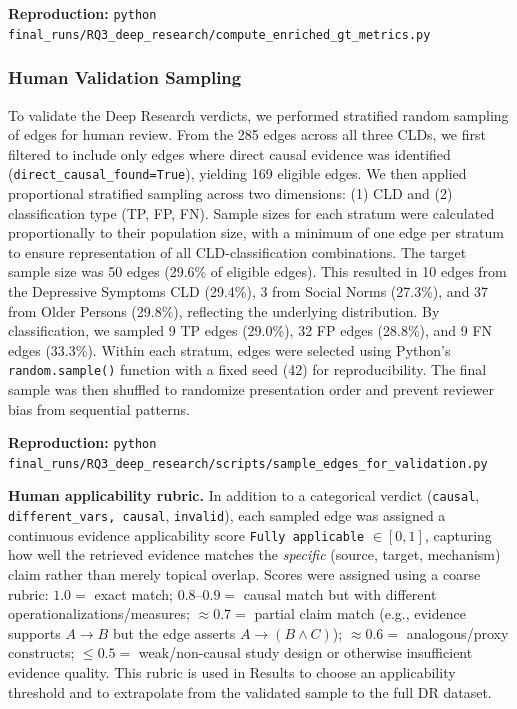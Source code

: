 \textbf{Reproduction:} \texttt{python final\_runs/RQ3\_deep\_research/compute\_enriched\_gt\_metrics.py}

\subsubsection{Human Validation Sampling}
\label{sec:rq3_human_validation}

To validate the Deep Research verdicts, we performed stratified random sampling of edges for human review. From the 285 edges across all three CLDs, we first filtered to include only edges where direct causal evidence was identified (\texttt{direct\_causal\_found=True}), yielding 169 eligible edges. We then applied proportional stratified sampling across two dimensions: (1) CLD and (2) classification type (TP, FP, FN). Sample sizes for each stratum were calculated proportionally to their population size, with a minimum of one edge per stratum to ensure representation of all CLD-classification combinations. The target sample size was 50 edges (29.6\% of eligible edges). This resulted in 10 edges from the Depressive Symptoms CLD (29.4\%), 3 from Social Norms (27.3\%), and 37 from Older Persons (29.8\%), reflecting the underlying distribution. By classification, we sampled 9 TP edges (29.0\%), 32 FP edges (28.8\%), and 9 FN edges (33.3\%). Within each stratum, edges were selected using Python's \texttt{random.sample()} function with a fixed seed (42) for reproducibility. The final sample was then shuffled to randomize presentation order and prevent reviewer bias from sequential patterns.

\textbf{Reproduction:} \texttt{python final\_runs/RQ3\_deep\_research/scripts/sample\_edges\_for\_validation.py}

\vspace{0.25em}
\textbf{Human applicability rubric.} In addition to a categorical verdict (\texttt{causal}, \texttt{different\_vars, causal}, \texttt{invalid}), each sampled edge was assigned a continuous evidence applicability score \texttt{Fully applicable} \(\in[0,1]\), capturing how well the retrieved evidence matches the \textit{specific} (source, target, mechanism) claim rather than merely topical overlap. Scores were assigned using a coarse rubric: \(1.0=\) exact match; \(0.8\text{--}0.9=\) causal match but with different operationalizations/measures; \(\approx 0.7=\) partial claim match (e.g., evidence supports \(A\rightarrow B\) but the edge asserts \(A\rightarrow(B \wedge C)\)); \(\approx 0.6=\) analogous/proxy constructs; \(\le 0.5=\) weak/non-causal study design or otherwise insufficient evidence quality. This rubric is used in Results to choose an applicability threshold and to extrapolate from the validated sample to the full DR dataset.

